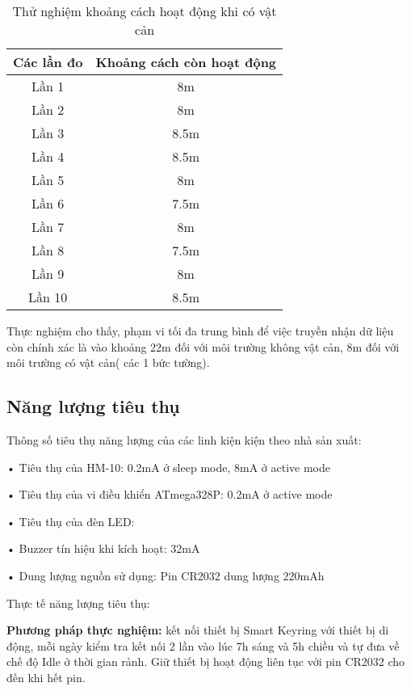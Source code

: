 \begin{table}[!ht]
	\centering
	\begin{tabular}{|c | c|}
		\hline 
		 Các lần đo & Khoảng cách còn hoạt động  \\ 
		\hline
		Lần 1 &	8m \\
		
		Lần 2 &	8m \\
		
		Lần 3 &	8.5m \\
		
		Lần 4 &	8.5m \\
		
		Lần 5 &	8m \\
		
		Lần 6 &	7.5m \\
		
		Lần 7 &	8m \\
		
		Lần 8 &	7.5m \\
		
		Lần 9 &	8m \\
		
		Lần 10 & 8.5m \\		
		\hline 		
	\end{tabular}
\caption{Thử nghiệm khoảng cách hoạt động khi có vật cản}		
\label{table:distance}
\end{table}

Thực nghiệm cho thấy, phạm vi tối đa trung bình để việc truyền nhận dữ liệu còn chính xác là vào khoảng 22m đối với môi trường không vật cản, 8m đối với môi trường có vật cản( các 1 bức tường).

\newpage
\subsection{Năng lượng tiêu thụ}
Thông số tiêu thụ năng lượng của các linh kiện kiện theo nhà sản xuất:

• Tiêu thụ của HM-10: 0.2mA ở sleep mode, 8mA ở active mode

• Tiêu thụ của vi điều khiển ATmega328P: 0.2mA ở active mode

• Tiêu thụ của đèn LED: 

• Buzzer tín hiệu khi kích hoạt: 32mA

• Dung lượng nguồn sử dụng: Pin CR2032 dung lượng 220mAh

Thực tế năng lượng tiêu thụ:

\textbf{Phương pháp thực nghiệm:} kết nối thiết bị Smart Keyring với thiết bị di động, mỗi ngày kiểm tra kết nối 2 lần vào lúc 7h sáng và 5h chiều và tự đưa về chế độ Idle ở thời gian rảnh. Giữ thiết bị hoạt động liên tục với pin CR2032 cho đến khi hết pin.

